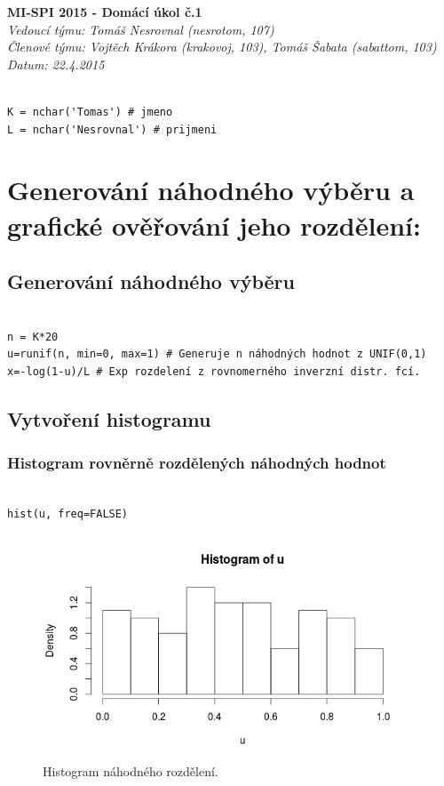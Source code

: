 \documentclass[12pt]{article}
\begin{document}
\sffamily\fontsize{26}{15}\color{MSBlue}\textbf{MI-SPI 2015 - Domácí úkol č.1}\\
\color{MSBlue}\underline{\hspace{17cm}}
\sffamily\fontsize{12}{15}\color{MSBlue}\textit{Vedoucí týmu: Tomáš Nesrovnal (nesrotom, 107)}\\
\sffamily\fontsize{12}{15}\color{MSBlue}\textit{Členové týmu: Vojtěch Krákora (krakovoj, 103), Tomáš Šabata (sabattom, 103)}\\
\sffamily\fontsize{12}{15}\color{MSBlue}\textit{Datum: 22.4.2015}\\
  \begin{lstlisting}[frame=single]  % Start your code-block

K = nchar('Tomas') # jmeno
L = nchar('Nesrovnal') # prijmeni
\end{lstlisting}
\section{Generování náhodného výběru a grafické ověřování jeho rozdělení:}
\subsection{Generování náhodného výběru}
  \begin{lstlisting}[frame=single]  % Start your code-block
  
n = K*20
u=runif(n, min=0, max=1) # Generuje n náhodných hodnot z UNIF(0,1)
x=-log(1-u)/L # Exp rozdelení z rovnomerného inverzní distr. fcí.
\end{lstlisting}
\subsection{Vytvoření histogramu}
\subsubsection{Histogram rovněrně rozdělených náhodných hodnot}
\begin{lstlisting}[frame=single]  % Start your code-block
    
hist(u, freq=FALSE)
\end{lstlisting}
\begin{figure}[h!t]
	\includegraphics[scale=0.5]{img/histogram_u}\centering
	\caption{Histogram náhodného rozdělení.}
	\label{obr:sikme}
\end{figure}
\end{document}
